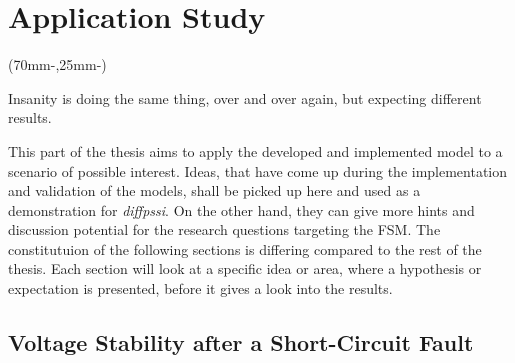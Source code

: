


\chapter{Application Study}
\label{chap:case-study}

\begin{textblock*}{.7\textwidth}(70mm-\offset,25mm-\offset)
    \begin{fquote}
        Insanity is doing the same thing, over and over again, but expecting different results.
    \end{fquote}
\end{textblock*}

This part of the thesis aims to apply the developed and implemented model to a scenario of possible interest.
Ideas, that have come up during the implementation and validation of the models, shall be picked up here and used as a demonstration for \textit{diffpssi}.
On the other hand, they can give more hints and discussion potential for the research questions targeting the \acs{FSM}.
The constitutuion of the following sections is differing compared to the rest of the thesis.
Each section will look at a specific idea or area, where a hypothesis or expectation is presented, before it gives a look into the results.

\section{Voltage Stability after a Short-Circuit Fault}
\label{sec:case-1}

